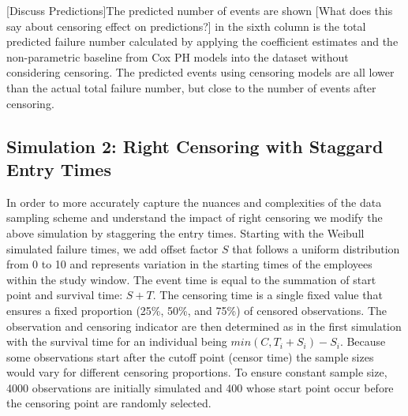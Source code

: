 \documentclass[12pt,letterpaper]{article}
\begin{document}
[Discuss Predictions]The predicted number of events are shown [What does this say about censoring effect on predictions?] in the sixth column is the total predicted failure number calculated by applying the coefficient estimates and the non-parametric baseline from Cox PH models into the dataset without considering censoring. The predicted events using censoring models are all lower than the actual total failure number, but close to the number of events after censoring.



\subsection{Simulation 2: Right Censoring with Staggard Entry Times}

In order to more accurately capture the nuances and complexities of the data sampling scheme and understand the impact of right censoring we modify the above simulation by staggering the entry times.  Starting with the Weibull simulated failure times, we add offset factor $S$ that follows a uniform distribution from 0 to 10 and represents variation in the starting times of the employees within the study window. The event time is equal to the summation of start point and survival time: $S+T$. The censoring time is a single fixed value that ensures a fixed proportion (25\%, 50\%, and 75\%) of censored observations.  The observation and censoring indicator are then determined as in the first simulation with the survival time for an individual being $min(C,T_i+S_i) - S_i$. Because some observations start after the cutoff point (censor time) the sample sizes would vary for different censoring proportions.  To ensure constant sample size, 4000 observations are initially simulated and 400 whose start point occur before the censoring point are randomly selected.
\end{document}
